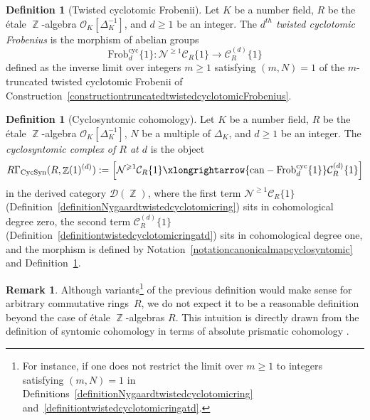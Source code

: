 \documentclass[10pt,twoside]{scrarticle}
\newlength{\mar} \setlength{\mar}{1cm}%
\newlength{\len}
\theoremstyle{definition}
\newtheorem{remark}[theorem]{Remark}
\newtheorem{definition}[theorem]{Definition}
\DeclareMathOperator{\Z}{\mathbb{Z}}
\newcommand{\CR}{\mathcal{C}_{R}}
\newcommand{\can}{\text{can}}
\newcommand{\Frob}{\mathrm{Frob}}
\newcommand{\Cyc}{\mathrm{cyc}}
\newcommand{\CycSyn}{\mathrm{CycSyn}}
\renewcommand{\ge}{\geqslant}
\numberwithin{equation}{theorem}
\begin{document}
\begin{definition}[Twisted cyclotomic Frobenii]\label{definitiontwistedcyclotomicFrobenius}
    Let $K$ be a number field, $R$ be the étale $\Z$-algebra $\mathcal{O}_K[\Delta_K^{-1}]$, and $d \ge 1$ be an integer. The \emph{$d^{th}$ twisted cyclotomic Frobenius} is the morphism of abelian groups
    $$\Frob_d^{\Cyc}\{1\} : \mathcal{N}^{\ge 1} \CR\{1\} \longrightarrow \CR^{(d)}\{1\}$$
    defined as the inverse limit over integers $m \ge 1$ satisfying $(m,N)=1$ of the $m$-truncated twisted cyclotomic Frobenii of Construction~\ref{constructiontruncatedtwistedcyclotomicFrobenius}. 
\end{definition}

\begin{definition}[Cyclosyntomic cohomology]\label{definitioncyclosyntomiccohomology} 
    Let $K$ be a number field, $R$ be the étale $\Z$-algebra $\mathcal{O}_K[\Delta_K^{-1}]$, $N$ be a multiple of $\Delta_K$, and $d \ge 1$ be an integer. The \emph{cyclosyntomic complex of $R$ at $d$} is the object
    $$R\Gamma_{\CycSyn}(R,\Z(1)^{(d)}) := \left[ \mathcal{N}^{\ge 1} \mathcal{C}_R\{1\} \xlongrightarrow{\can - \Frob^{\Cyc}_d\{1\}} \mathcal{C}_R^{(d)}\{1\} \right]$$
    in the derived category $\mathcal{D}(\Z)$, where the first term $\mathcal{N}^{\ge 1} \CR\{1\}$ (Definition~\ref{definitionNygaardtwistedcyclotomicring}) sits in cohomological degree zero, the second term $\CR^{(d)}\{1\}$ (Definition~\ref{definitiontwistedcyclotomicringatd}) sits in cohomological degree one, and the morphism is defined by Notation~\ref{notationcanonicalmapcyclosyntomic} and Definition~\ref{definitiontwistedcyclotomicFrobenius}.
\end{definition}

\begin{remark}
    Although variants\footnote{For instance, if one does not restrict the limit over $m \ge 1$ to integers satisfying $(m,N)=1$ in Definitions~\ref{definitionNygaardtwistedcyclotomicring} and~\ref{definitiontwistedcyclotomicringatd}.} of the previous definition would make sense for arbitrary commutative rings~$R$, we do not expect it to be a reasonable definition beyond the case of étale $\Z$-algebras $R$. This intuition is directly drawn from the definition of syntomic cohomology in terms of absolute prismatic cohomology \cite{bhatt_prisms_2022,bhatt_absolute_2022}.
\end{remark}
\end{document}

